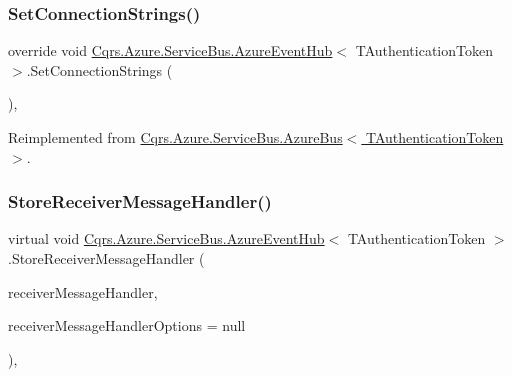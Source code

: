 \subsubsection{\texorpdfstring{Set\+Connection\+Strings()}{SetConnectionStrings()}}
{\footnotesize\ttfamily override void \hyperlink{classCqrs_1_1Azure_1_1ServiceBus_1_1AzureEventHub}{Cqrs.\+Azure.\+Service\+Bus.\+Azure\+Event\+Hub}$<$ T\+Authentication\+Token $>$.Set\+Connection\+Strings (\begin{DoxyParamCaption}{ }\end{DoxyParamCaption})\hspace{0.3cm}{\ttfamily [protected]}, {\ttfamily [virtual]}}



Reimplemented from \hyperlink{classCqrs_1_1Azure_1_1ServiceBus_1_1AzureBus_a8a1be9145b0a92c0037ef1b8b4cc79d9}{Cqrs.\+Azure.\+Service\+Bus.\+Azure\+Bus$<$ T\+Authentication\+Token $>$}.

\mbox{\label{classCqrs_1_1Azure_1_1ServiceBus_1_1AzureEventHub_a5924517b1e88c09e3c0c1aec9c737a8d}} 
\subsubsection{\texorpdfstring{Store\+Receiver\+Message\+Handler()}{StoreReceiverMessageHandler()}}
{\footnotesize\ttfamily virtual void \hyperlink{classCqrs_1_1Azure_1_1ServiceBus_1_1AzureEventHub}{Cqrs.\+Azure.\+Service\+Bus.\+Azure\+Event\+Hub}$<$ T\+Authentication\+Token $>$.Store\+Receiver\+Message\+Handler (\begin{DoxyParamCaption}\item[{Action$<$ Partition\+Context, Event\+Data $>$}]{receiver\+Message\+Handler,  }\item[{Event\+Processor\+Options}]{receiver\+Message\+Handler\+Options = {\ttfamily null} }\end{DoxyParamCaption})\hspace{0.3cm}{\ttfamily [protected]}, {\ttfamily [virtual]}}

\mbox{\label{classCqrs_1_1Azure_1_1ServiceBus_1_1AzureEventHub_a779ce1115cf00dfaf072056a6ad8f9fe}} 
